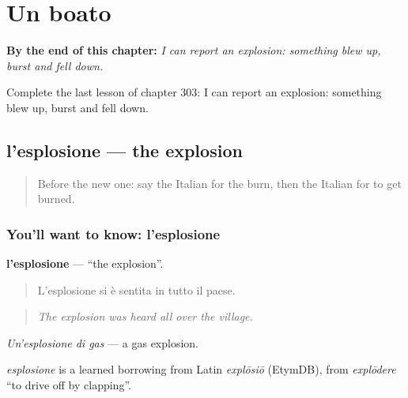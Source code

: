 
\chapter{Un boato}
\label{ch:it-un-boato}

\begin{chapteropening}
\textbf{By the end of this chapter:} \emph{I can report an explosion: something blew up, burst and fell down.}

Complete the last lesson of chapter 303: I can report an explosion: something blew up, burst and fell down.
\end{chapteropening}

\section[l'esplosione]{l'esplosione — the explosion}

\label{lesson:IT-C303-esplosione}



\begin{quote}
Before the new one: say the Italian for the burn, then the Italian for to get burned.
\end{quote}

\subsection*{You'll want to know: l'esplosione}
\textbf{l'esplosione} — \textquotedblleft{}the explosion\textquotedblright{}.

\begin{quote}
L'esplosione si è sentita in tutto il paese.
\end{quote}

\begin{quote}
\emph{The explosion was heard all over the village.}
\end{quote}

\emph{Un'esplosione di gas} — a gas explosion.

\begin{cousinweb}
\emph{esplosione} is a learned borrowing from Latin \emph{explōsiō} (EtymDB), from \emph{explōdere} \textquotedblleft{}to drive off by clapping\textquotedblright{}.
\end{cousinweb}

